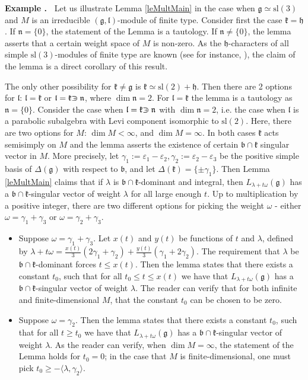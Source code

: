 \documentclass[12pt]{report}
\newenvironment{example}{ \smallskip \addtocounter{theo}{1} \noindent \textbf{Example  \arabic{section}.\arabic{theo}~}}{}%
\newcommand{\kk}{\mathfrak{k}}
\newcommand{\nn}{\mathfrak{n}}
\newcommand{\hh}{\mathfrak{h}}
\newcommand{\gG}{\mathfrak{g}}
\newcommand{\bb}{\mathfrak{b}}
\newcommand{\lL}{\mathfrak{l}}
\newcommand{\sL}{\mathrm{sl}}
\newcommand{\eps}{\varepsilon}
\def\crplus{\hbox{$\supset${\raise1.05pt\hbox{\kern -0.60em ${\scriptscriptstyle +}$}}\ }}
\begin{document}
\begin{example} 
Let us illustrate Lemma \ref{leMultMain} in the case when $\gG\simeq \sL(3)$ and $M$ is an irreducible $(\gG,\lL)$-module of finite type. Consider first the case $\kk=\hh$. If $\nn=\{0\}$, the statement of the Lemma is a tautology. If $\nn\neq \{0\}$, the lemma asserts that a certain weight space of $M$ is non-zero. As the $\hh$-characters of all simple $\sL(3)$-modules of finite type are known (see for instance, \cite[Section 7]{Mathieu}), the claim of the lemma is a direct corollary of this result. 

The only other possibility for $\kk\neq\gG$ is $\kk\simeq \sL(2)+\hh$. Then there are 2 options for $\lL$: $\lL=\kk$ or $\lL=\kk\crplus \nn$, where $\dim \nn=2$. For $\lL=\kk$ the lemma is a tautology as $\nn=\{0\}$. Consider the case when $\lL=\kk\crplus\nn$ with $\dim \nn=2$, i.e. the case when $\lL$ is a parabolic subalgebra with Levi component isomorphic to $\sL(2)$. Here, there are two options for $M$: $\dim M<\infty$, and $\dim M=\infty$. In both cases $\kk$ acts semisimply on $M$ and the lemma asserts the existence of certain $\bb\cap\kk$ singular vector in $M$. More precisely, let $\gamma_1:=\eps_1-\eps_2, \gamma_2 :=\eps_2 - \eps_3$ be the positive simple basis of $\Delta(\gG)$ with respect to $\bb$, and let $\Delta(\kk)=\{\pm\gamma_1\}$. Then Lemma \ref{leMultMain} claims that if $\lambda$ is $\bb\cap\kk$-dominant and integral, then $L_{\lambda+t\omega}(\gG)$ has a $\bb\cap\kk$-singular vector of weight $\lambda$ for all large enough $t$. Up to multiplication by a positive integer, there are two different options for picking the weight $\omega$ - either  $\omega=\gamma_1+\gamma_3$ or $\omega=\gamma_2+\gamma_3$.

\begin{itemize}
\item Suppose $\omega=\gamma_1+\gamma_3$.  Let $x(t)$ and $y(t)$ be functions of $t$ and $\lambda$, defined by $\lambda+t\omega = \frac{x(t)}{3} ( 2\gamma_1 + \gamma_2) +\frac{y(t)}{3} (\gamma_1 + 2 \gamma_2) $. The requirement that $\lambda$ be $\bb\cap\kk$-dominant forces $ t\leq x(t) $. Then the lemma states that there exists a constant $t_0$, such that for all $t_0\leq t\leq x(t)$ we have that $L_{\lambda+t\omega}(\gG)$ has a $\bb\cap\kk$-singular vector of weight $\lambda$. The reader can verify that for both infinite and finite-dimensional $M$, that the constant $t_0$ can be chosen to be zero.

\item Suppose $\omega=\gamma_2$. Then the lemma states that there exists a constant $t_0$, such that for all $t\geq t_0$ we have that $L_{\lambda+t\omega}(\gG)$ has a $\bb\cap\kk$-singular vector of weight $\lambda$. As the reader can verify, when $\dim M=\infty$, the statement of the Lemma holds for $t_0=0$; in the case that $M$ is finite-dimensional, one must pick $t_0\geq -\langle\lambda,\gamma_2\rangle$.
\end{itemize}
 
\end{example}
\end{document}
